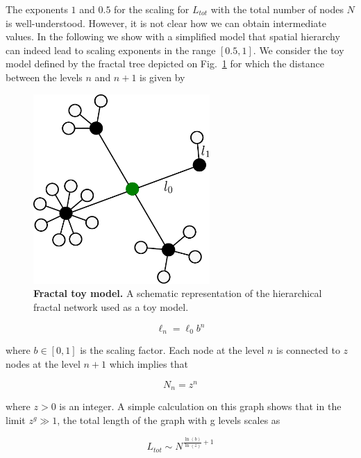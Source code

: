 The exponents $1$ and $0.5$ for the scaling for $L_{tot}$ with the total number
of nodes $N$ is well-understood. However, it is not clear how we can obtain
intermediate values. In the following we show with a simplified model that spatial
hierarchy can indeed lead to scaling exponents in the range $\left[0.5,
1\right]$. We consider the toy model defined by the fractal tree depicted on
Fig.~\ref{fig:fractal_network} for which the distance between the levels $n$ and
$n+1$ is given by

\begin{figure}
    \centering
    \includegraphics[width=0.60\textwidth]{gfx/chapter-networks/figure7.pdf}
    \caption{{\bf Fractal toy model.} A schematic representation of the hierarchical fractal network used as a toy model. 
    \label{fig:fractal_network}}
\end{figure}

\begin{equation}
    \ell_n=\ell_0 b^n
    \label{eq:fractal_distance}
\end{equation}

where $b\in [0,1]$ is the scaling factor. Each node at the level $n$ is
connected to $z$ nodes at the level $n+1$ which implies that

\begin{equation}
    N_n = z^n
    \label{eq:fractal_nodes}
\end{equation}

where $z>0$ is an integer. A simple calculation on this graph shows that in the
limit $z^g \gg 1$, the total length of the graph with g levels scales as

\begin{equation}
    L_{tot} \sim N^{\frac{\ln(b)}{\ln(z)}+1}
\end{equation}

